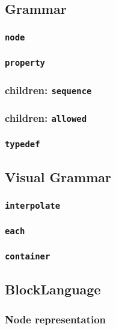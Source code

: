 \subsection{Grammar}

\subsubsection{\texttt{node}}

\subsubsection{\texttt{property}}

\subsubsection{children: \texttt{sequence}}

\subsubsection{children: \texttt{allowed}}

\subsubsection{\texttt{typedef}}

\subsection{Visual Grammar}

\subsubsection{\texttt{interpolate}}

\subsubsection{\texttt{each}}

\subsubsection{\texttt{container}}

\subsection{BlockLanguage}

\subsubsection{Node representation}

